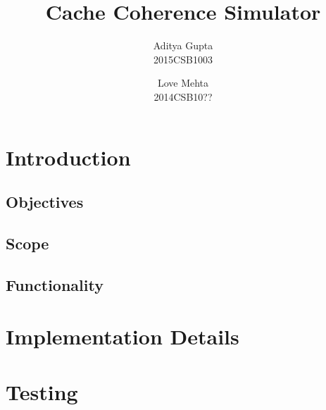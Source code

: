 \documentclass{article}
\title{Cache Coherence Simulator}
\author{Aditya Gupta\\2015CSB1003 \and Love Mehta\\2014CSB10??}
\begin{document}
\maketitle
\section{Introduction}
\subsection{Objectives}
\subsection{Scope}
\subsection{Functionality}
\section{Implementation Details}
\section{Testing}
\end{document}
